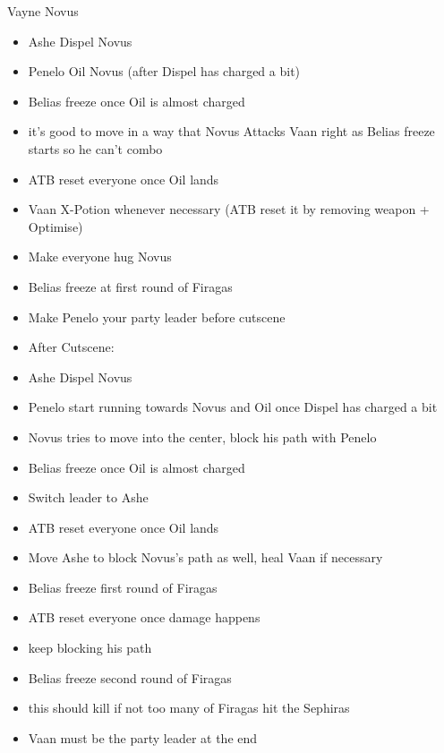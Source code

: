 \begin{battle}{Vayne Novus}
	\begin{itemize}
		\item  Ashe Dispel Novus
		\item  Penelo Oil Novus (after Dispel has charged a bit)
		\item  Belias freeze once Oil is almost charged
		\item  it's good to move in a way that Novus Attacks Vaan right as Belias freeze starts so he can't combo
		\item  ATB reset everyone once Oil lands
		\item  Vaan X-Potion whenever necessary (ATB reset it by removing weapon + Optimise)
		\item  Make everyone hug Novus
		\item  Belias freeze at first round of Firagas
		\item  Make Penelo your party leader before cutscene
		\item  After Cutscene:
		\item  Ashe Dispel Novus
		\item  Penelo start running towards Novus and Oil once Dispel has charged a bit
		\item  Novus tries to move into the center, block his path with Penelo
		\item  Belias freeze once Oil is almost charged
		\item  Switch leader to Ashe
		\item  ATB reset everyone once Oil lands
		\item  Move Ashe to block Novus's path as well, heal Vaan if necessary
		\item  Belias freeze first round of Firagas
		\item  ATB reset everyone once damage happens
		\item  keep blocking his path
		\item  Belias freeze second round of Firagas
		\item  this should kill if not too many of Firagas hit the Sephiras
		\item  Vaan must be the party leader at the end
	\end{itemize}
\end{battle}
